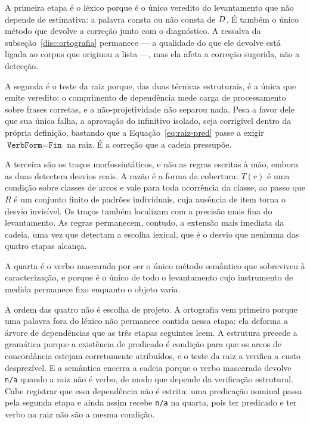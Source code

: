 A primeira etapa é o léxico porque é o único veredito do levantamento que não depende de
estimativa: a palavra consta ou não consta de $D$. É também o único método que devolve a
correção junto com o diagnóstico. A ressalva da subseção~\ref{disc:ortografia} permanece --- a
qualidade do que ele devolve está ligada ao corpus que originou a lista ---, mas ela afeta a
correção sugerida, não a detecção.

A segunda é o teste da raiz porque, das duas técnicas estruturais, é a única que emite
veredito: o comprimento de dependência mede carga de processamento sobre frases corretas, e a
não-projetividade não separou nada. Pesa a favor dele que sua única falha, a aprovação do
infinitivo isolado, seja corrigível dentro da própria definição, bastando que a
Equação~\ref{eq:raiz-pred} passe a exigir $\texttt{VerbForm} = \texttt{Fin}$ na raiz. É a
correção que a cadeia pressupõe.

A terceira são os traços morfossintáticos, e não as regras escritas à mão, embora as duas
detectem desvios reais. A razão é a forma da cobertura: $T(r)$ é uma condição sobre classes de
arcos e vale para toda ocorrência da classe, ao passo que $R$ é um conjunto finito de padrões
individuais, cuja ausência de item torna o desvio invisível. Os traços também localizam com a
precisão mais fina do levantamento. As regras permanecem, contudo, a extensão mais imediata da
cadeia, uma vez que detectam a escolha lexical, que é o desvio que nenhuma das quatro etapas
alcança.

A quarta é o verbo mascarado por ser o único método semântico que sobreviveu à caracterização,
e porque é o único de todo o levantamento cujo instrumento de medida permanece fixo enquanto o
objeto varia.

A ordem das quatro não é escolha de projeto. A ortografia vem primeiro porque uma palavra fora
do léxico não permanece contida nessa etapa: ela deforma a árvore de dependências que as três
etapas seguintes leem. A estrutura precede a gramática porque a existência de predicado é
condição para que os arcos de concordância estejam corretamente atribuídos, e o teste da raiz a
verifica a custo desprezível. E a semântica encerra a cadeia porque o verbo mascarado devolve
\texttt{n/a} quando a raiz não é verbo, de modo que depende da verificação estrutural. Cabe
registrar que essa dependência não é estrita: uma predicação nominal passa pela segunda etapa e
ainda assim recebe \texttt{n/a} na quarta, pois ter predicado e ter verbo na raiz não são a
mesma condição.


